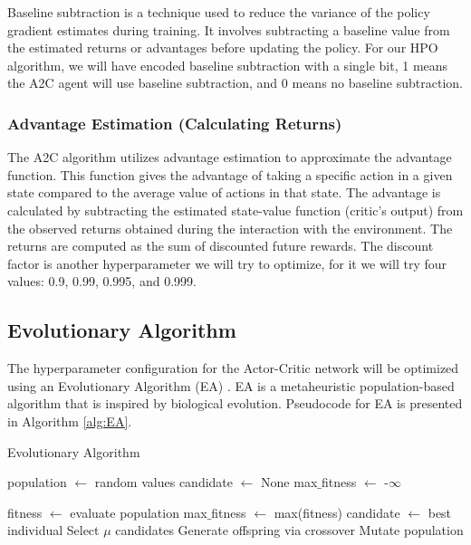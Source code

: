 \documentclass{article}
\begin{document}
Baseline subtraction is a technique used to reduce the variance of the policy gradient estimates during training.
It involves subtracting a baseline value from the estimated returns or advantages before updating the policy.
For our HPO algorithm, we will have encoded baseline subtraction with a single bit, 1 means the A2C agent will use baseline subtraction, and 0 means no baseline subtraction.

\subsubsection{Advantage Estimation (Calculating Returns)}
\label{sssec:advest}

The A2C algorithm utilizes advantage estimation to approximate the advantage function.
This function gives the advantage of taking a specific action in a given state compared to the average value of actions in that state.
The advantage is calculated by subtracting the estimated state-value function (critic's output) from the observed returns obtained during the interaction with the environment.
The returns are computed as the sum of discounted future rewards. 
The discount factor is another hyperparameter we will try to optimize, for it we will try four values: 0.9, 0.99, 0.995, and 0.999.


\subsection{Evolutionary Algorithm}
\label{ssec:EA}

The hyperparameter configuration for the Actor-Critic network will be optimized using an Evolutionary Algorithm (EA) \cite{Simon2013EvolutionaryOA}.
EA is a metaheuristic population-based algorithm that is inspired by biological evolution.
Pseudocode for EA is presented in Algorithm \ref{alg:EA}.

\begin{algorithm}[htbp]
    \caption{Evolutionary Algorithm}
    \label{alg:EA}
    \begin{algorithmic}[1]
        \STATE population $\gets$ random values
        \STATE candidate $\gets$ None
        \STATE max$\_$fitness $\gets$ -$\infty$
        
            \STATE fitness $\gets$ evaluate population
            	\STATE max$\_$fitness $\gets$ max(fitness)
            	\STATE candidate $\gets$ best individual
            \ENDIF
            \STATE Select $\mu$ candidates
            \STATE Generate offspring via crossover
            \STATE Mutate population
        \ENDFOR        
    \end{algorithmic}
\end{algorithm}
\end{document}
